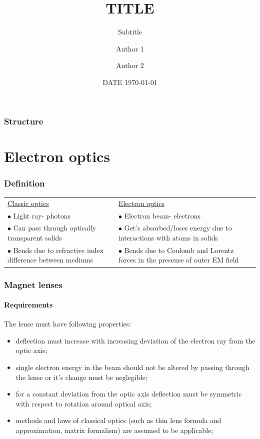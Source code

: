 \documentclass{beamer}
\title{TITLE}
\subtitle{Subtitle}
\author{Author 1 \and Author 2}
\date{DATE \today}
\begin{document}
\begin{frame}[plain]
  \titlepage
\end{frame}

\begin{frame}
  \frametitle{Structure}
  \tableofcontents%
\end{frame}

\section{Electron optics}
  \begin{frame}
  \frametitle{Definition}
  \begin{table}[t]
  \centering
  \begin{tabular}{   m{5cm}  m{5cm}  } 
  \underline{ Classic optics} & \underline{Electron optics} \\ 
   $\bullet$ Light ray- photons &  $\bullet$ Electron beam- electrons  \\ 
   $\bullet$ Can pass through optically transparent solids  & $\bullet$  Get's absorbed/loses energy due to interactions with atoms in solids \\ 
   $\bullet$ Bends due to refractive index difference between mediums  & $\bullet$  Bends due to Coulomb and Lorentz forces in the presense of outer EM field \\ 
  \end{tabular}
  \end{table}
  
  \end{frame}

  \begin{frame}
  \frametitle{Magnet lenses}
  \framesubtitle{Requirements}
  The lense must have following properties:
  \begin{itemize}
   \item deflection must increase with increasing deviation of the electron ray from the optic axis;
   \item single electron energy in the beam should not be altered by passing through the lense or it's change must be neglegible;
   \item for a constant deviation from the optic axis deflection must be symmetric with respect to rotation around optical axis;
   \item methods and laws of classical optics (such as thin lens formula and approximation, matrix formalism) are assumed to be applicable;
  \end{itemize}
  \end{frame}
\end{document}
